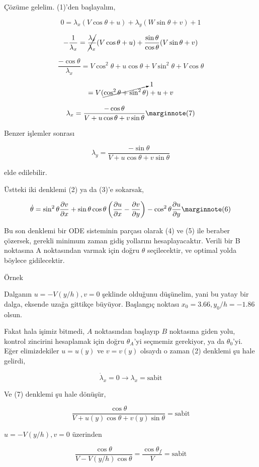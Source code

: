 \documentclass[12pt,fleqn]{article}\usepackage{../../common}
\begin{document}
Çözüme gelelim. (1)'den başlayalım, 

$$
0 = \lambda_x (V \cos\theta + u) + \lambda_y (W \sin\theta + v) + 1
$$

$$
-\frac{1}{\lambda_x} = \cancel{\frac{\lambda_x}{\lambda_x}}
(V  \cos\theta + u) + \frac{\sin\theta}{\cos\theta} (V \sin\theta + v)
$$

$$
\frac{-\cos\theta}{\lambda_x} = 
V \cos^2\theta + u\cos\theta + V \sin^2\theta + V \cos\theta
$$

$$
= V (\cancelto{1}{\cos^2\theta + \sin^2\theta}) + u + v
$$

$$
\lambda_x = \frac{-\cos\theta}{V + u\cos\theta + v\sin\theta} 
\mlabel{7}
$$

Benzer işlemler sonrası 

$$
\lambda_y = \frac{-\sin\theta}{V + u\cos\theta + v\sin\theta}
$$

elde edilebilir.

Üstteki iki denklemi (2) ya da (3)'e sokarsak, 

$$
\dot{\theta} = \sin^2\theta \frac{\partial v}{\partial x} + 
\sin\theta \cos\theta \left( \frac{\partial u}{\partial x} - \frac{\partial v}{\partial y} \right)-
\cos^2 \theta \frac{\partial u}{\partial y}
\mlabel{6}
$$

Bu son denklemi bir ODE sisteminin parçası olarak (4) ve (5) ile
beraber çözersek, gerekli minimum zaman gidiş yollarını
hesaplayacaktır. Verili bir B noktasına A noktasından varmak için
doğru $\theta$ seçilecektir, ve optimal yolda böylece gidilecektir. 

Örnek

Dalganın $u = -V(y/h), v=0$ şeklinde olduğunu düşünelim, yani bu yatay bir
dalga, eksende uzağa gittikçe büyüyor. Başlangıç noktası $x_0 = 3.66, y_0/h
= -1.86$ olsun. 

Fakat hala işimiz bitmedi, $A$ noktasından başlayıp $B$ noktasına giden
yolu, kontrol zincirini hesaplamak için doğru $\theta_A$'yi seçmemiz
gerekiyor, ya da $\theta_0$'yi. Eğer elimizdekiler $u=u(y)$ ve $v=v(y)$
olsaydı o zaman (2) denklemi şu hale gelirdi,

$$
\dot{\lambda}_x = 0 \to \lambda_x = \textrm{sabit}
$$

Ve (7) denklemi şu hale dönüşür,

$$
\frac{\cos\theta}{V + u(y)\cos\theta + v(y)\sin\theta} = \textrm{sabit}
$$

$u = -V(y/h), v=0$ üzerinden

$$
\frac{\cos\theta}{V - V(y/h)\cos\theta} = \frac{\cos\theta_f}{V} = \textrm{sabit}
$$
\end{document}
